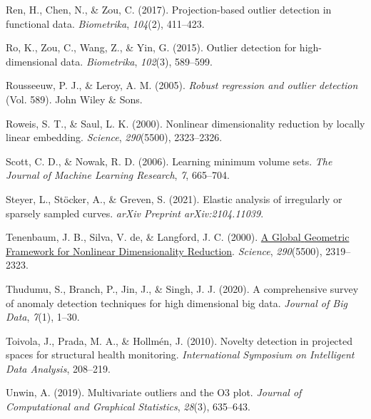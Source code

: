 \documentclass[
  10pt]{article}
\newlength{\cslhangindent}
\newlength{\cslentryspacingunit} %
\newenvironment{CSLReferences}[2] %
 {%
  \setlength{\parindent}{0pt}
  \ifodd #1
  \let\oldpar\par
  \def\par{\hangindent=\cslhangindent\oldpar}
  \fi
  \setlength{\parskip}{#2\cslentryspacingunit}
 }%
 {}
\begin{document}
\begin{CSLReferences}{1}{0}
\leavevmode{}%
Ren, H., Chen, N., \& Zou, C. (2017). Projection-based outlier detection in functional data. \emph{Biometrika}, \emph{104}(2), 411--423.

\leavevmode{}%
Ro, K., Zou, C., Wang, Z., \& Yin, G. (2015). Outlier detection for high-dimensional data. \emph{Biometrika}, \emph{102}(3), 589--599.

\leavevmode{}%
Rousseeuw, P. J., \& Leroy, A. M. (2005). \emph{Robust regression and outlier detection} (Vol. 589). John Wiley \& Sons.

\leavevmode{}%
Roweis, S. T., \& Saul, L. K. (2000). Nonlinear dimensionality reduction by locally linear embedding. \emph{Science}, \emph{290}(5500), 2323--2326.

\leavevmode{}%
Scott, C. D., \& Nowak, R. D. (2006). Learning minimum volume sets. \emph{The Journal of Machine Learning Research}, \emph{7}, 665--704.

\leavevmode{}%
Steyer, L., Stöcker, A., \& Greven, S. (2021). Elastic analysis of irregularly or sparsely sampled curves. \emph{arXiv Preprint arXiv:2104.11039}.

\leavevmode{}%
Tenenbaum, J. B., Silva, V. de, \& Langford, J. C. (2000). \href{https://www.ncbi.nlm.nih.gov/pubmed/11125149}{A {Global} {Geometric} {Framework} for {Nonlinear} {Dimensionality} {Reduction}}. \emph{Science}, \emph{290}(5500), 2319--2323.

\leavevmode{}%
Thudumu, S., Branch, P., Jin, J., \& Singh, J. J. (2020). A comprehensive survey of anomaly detection techniques for high dimensional big data. \emph{Journal of Big Data}, \emph{7}(1), 1--30.

\leavevmode{}%
Toivola, J., Prada, M. A., \& Hollmén, J. (2010). Novelty detection in projected spaces for structural health monitoring. \emph{International Symposium on Intelligent Data Analysis}, 208--219.

\leavevmode{}%
Unwin, A. (2019). Multivariate outliers and the {O}3 plot. \emph{Journal of Computational and Graphical Statistics}, \emph{28}(3), 635--643.


\end{CSLReferences}
\end{document}
